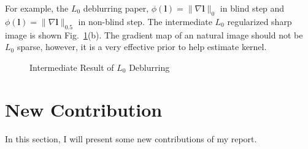 \documentclass[journal, onecolumn, 10pt]{IEEEtran}
\begin{document}
For example, the $L_0$ deblurring paper, $\phi(\mathbf{l}) = \|\nabla \mathbf{l} \|_0$ in blind step and $\phi(\mathbf{l}) = \|\nabla \mathbf{l} \|_{0.5}$ in non-blind step. The intermediate $L_0$ regularized sharp image is shown Fig.~\ref{fig:L0_deblur_intermediate}(b). The gradient map of an natural image should not be $L_0$ sparse, however, it is a very effective prior to help estimate kernel.
\begin{figure}[h!]
\centering
{}
\hspace{\fill}
\hspace{\fill}
\hspace{\fill}
\caption{Intermediate Result of $L_0$ Deblurring}
\label{fig:L0_deblur_intermediate}
\end{figure}


\section{New Contribution}
In this section, I will present some new contributions of my report. 
\end{document}
